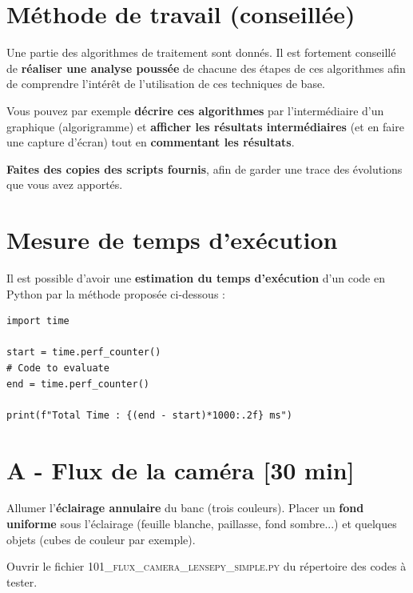 \documentclass[a4paper,12pt,titlepage]{article} %
\begin{document}
\vfill


\section{Méthode de travail (conseillée)}

Une partie des algorithmes de traitement sont donnés. Il est fortement conseillé de \textbf{réaliser une analyse poussée} de chacune des étapes de ces algorithmes afin de comprendre l'intérêt de l'utilisation de ces techniques de base.

\medskip

Vous pouvez par exemple \textbf{décrire ces algorithmes} par l'intermédiaire d'un graphique (algorigramme) et \textbf{afficher les résultats intermédiaires} (et en faire une capture d'écran) tout en \textbf{commentant les résultats}. 

\medskip

\textbf{Faites des copies des scripts fournis}, afin de garder une trace des évolutions que vous avez apportés.


\section{Mesure de temps d'exécution}

Il est possible d'avoir une \textbf{estimation du temps d'exécution} d'un code en Python par la méthode proposée ci-dessous :

\begin{lstlisting}
import time

start = time.perf_counter()
# Code to evaluate
end = time.perf_counter()

print(f"Total Time : {(end - start)*1000:.2f} ms")
\end{lstlisting}


\newpage

\section{A - Flux de la caméra {[30 min]}}

\Manip Allumer l'\textbf{éclairage annulaire} du banc (trois couleurs). Placer un \textbf{fond uniforme} sous l'éclairage (feuille blanche, paillasse, fond sombre...) et quelques objets (cubes de couleur par exemple).

\Manip Ouvrir le fichier \textsc{101\_flux\_camera\_lensepy\_simple.py} du répertoire des codes à tester.
\end{document}
